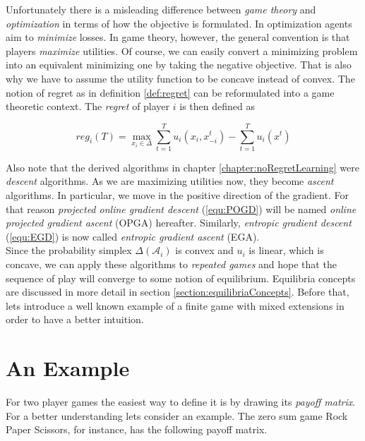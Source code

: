 Unfortunately there is a misleading difference between \textit{game theory} and \textit{optimization} in terms of how the objective is formulated. In optimization agents aim to \textit{minimize} losses. In game theory, however, the general convention is that players \textit{maximize} utilities. Of course, we can easily convert a minimizing problem into an equivalent minimizing one by taking the negative objective. That is also why we have to assume the utility function to be concave instead of convex. The notion of regret as in definition \ref{def:regret} can be reformulated into a game theoretic context. The \textit{regret} of player $i$ is then defined as

\begin{equation*}
    reg_{i}(T) = \max_{x_i \in \Delta}\sum_{t=1}^{T} u_i(x_i,x_{-i}^{t}) - \sum_{t=1}^{T}u_i(x^t)
\end{equation*}

Also note that the derived algorithms in chapter \ref{chapter:noRegretLearning} were \textit{descent} algorithms. As we are maximizing utilities now, they become \textit{ascent} algorithms. In particular, we move in the positive direction of the gradient. For that reason \textit{projected online gradient descent} (\ref{equ:POGD}) will be named \textit{online projected gradient ascent} (OPGA) hereafter. Similarly, \textit{entropic gradient descent} (\ref{equ:EGD}) is now called \textit{entropic gradient ascent} (EGA). \\

Since the probability simplex $\Delta(\mathcal{A}_i)$ is convex and $u_i$ is linear, which is concave, we can apply these algorithms to \textit{repeated games} and hope that the sequence of play will converge to some notion of equilibrium. Equilibria concepts are discussed in more detail in section \ref{section:equilibriaConcepts}. Before that, lets introduce a well known example of a finite game with mixed extensions in order to have a better intuition. 


\section{An Example}\label{section:anExample}

For two player games the easiest way to define it is by drawing its \textit{payoff matrix}. For a better understanding lets consider an example. The zero sum game Rock Paper Scissors, for instance, has the following payoff matrix.\\

